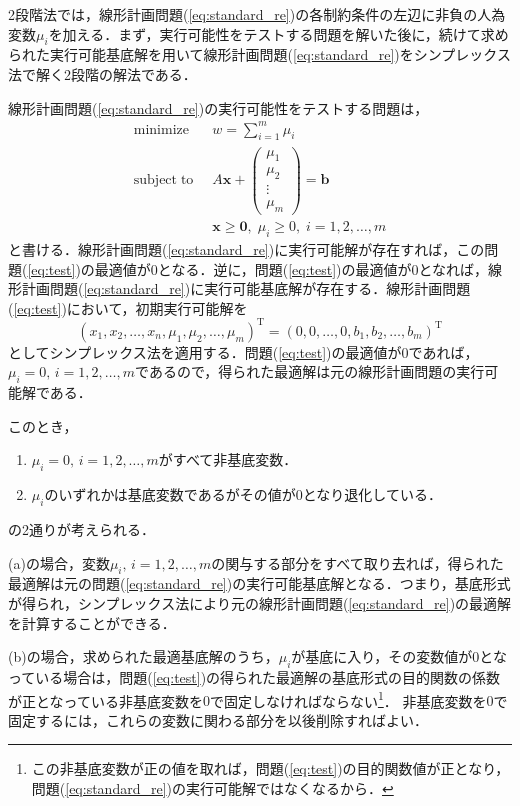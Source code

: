\documentclass{jsreport}
\begin{document}
2段階法では，線形計画問題(\ref{eq:standard_re})の各制約条件の左辺に非負の人為変数$\mu_i$を加える．まず，実行可能性をテストする問題を解いた後に，続けて求められた実行可能基底解を用いて線形計画問題(\ref{eq:standard_re})をシンプレックス法で解く2段階の解法である．

線形計画問題(\ref{eq:standard_re})の実行可能性をテストする問題は，
\begin{align}\label{eq:test}
  \mathrm{minimize} \; \; &w = \sum_{i = 1}^m \mu_i \nonumber \\
  \mathrm{subject \; to} \; \; &A\bm{x} + \left(
  \begin{array}{c}
    \mu_1 \\
    \mu_2 \\
    \vdots \\
    \mu_m
  \end{array}
  \right) = \bm{b} \\
  &\bm{x} \geq \bm{0}, \; \mu_i \geq 0, \; i = 1, 2, \ldots, m \nonumber
\end{align}
と書ける．線形計画問題(\ref{eq:standard_re})に実行可能解が存在すれば，この問題(\ref{eq:test})の最適値が$0$となる．逆に，問題(\ref{eq:test})の最適値が$0$となれば，線形計画問題(\ref{eq:standard_re})に実行可能基底解が存在する．線形計画問題(\ref{eq:test})において，初期実行可能解を
\begin{equation}\label{eq:sol_f}
  (x_1, x_2, \ldots, x_n, \mu_1, \mu_2, \ldots, \mu_m)^{\mathrm{T}} = (0, 0, \ldots, 0, b_1, b_2, \ldots, b_m)^{\mathrm{T}}
\end{equation}
としてシンプレックス法を適用する．問題(\ref{eq:test})の最適値が$0$であれば，$\mu_i = 0, \, i = 1, 2, \ldots, m$であるので，得られた最適解は元の線形計画問題の実行可能解である．

このとき，
\begin{enumerate}
  \renewcommand{\labelenumi}{(\alph{enumi})}
  \item $\mu_i = 0, \, i = 1, 2, \ldots, m$がすべて非基底変数．
  \item $\mu_i$のいずれかは基底変数であるがその値が$0$となり退化している．
\end{enumerate}
の2通りが考えられる．

(a)の場合，変数$\mu_i, \, i = 1, 2, \ldots, m$の関与する部分をすべて取り去れば，得られた最適解は元の問題(\ref{eq:standard_re})の実行可能基底解となる．つまり，基底形式が得られ，シンプレックス法により元の線形計画問題(\ref{eq:standard_re})の最適解を計算することができる．

(b)の場合，求められた最適基底解のうち，$\mu_i$が基底に入り，その変数値が$0$となっている場合は，問題(\ref{eq:test})の得られた最適解の基底形式の目的関数の係数が正となっている非基底変数を$0$で固定しなければならない\footnote{この非基底変数が正の値を取れば，問題(\ref{eq:test})の目的関数値が正となり，問題(\ref{eq:standard_re})の実行可能解ではなくなるから．}．
非基底変数を$0$で固定するには，これらの変数に関わる部分を以後削除すればよい．
\end{document}
